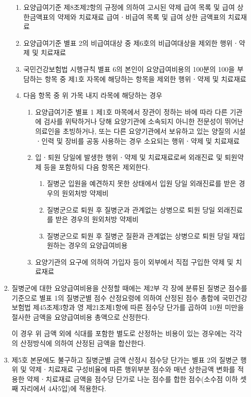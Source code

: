 \begin{enumerate}[1.]
\begin{enumerate}[가.]
	\item 요양급여기준 제8조제2항의 규정에 의하여 고시된 약제 급여 목록 및 급여 상한금액표의 약제와 치료재료 급여ㆍ비급여 목록 및 급여 상한 금액표의 치료재료
	\item 요양급여기준 별표 2의 비급여대상 중 제6호의 비급여대상을 제외한 행위ㆍ약제 및 치료재료
	\item 국민건강보험법 시행규칙 별표 6의 본인이 요양급여비용의 100분의 100을 부담하는 항목 중 제1호 자목에 해당하는 항목을 제외한 행위ㆍ약제 및 치료재료
	\item 다음 항목 중 위 가목 내지 라목에 해당하는 경우
		\begin{enumerate}[(1)]\tightlist
		\item 요양급여기준 별표 1 제1호 마목에서 장관이 정하는 바에 따라 다른 기관에 검사를 위탁하거나 당해 요양기관에 소속되지 아니한 전문성이 뛰어난 의료인을 초빙하거나, 또는 다른 요양기관에서 보유하고 있는 양질의 시설ㆍ인력 및 장비를 공동 사용하는 경우 소요되는 행위ㆍ약제 및 치료재료
		\item 입ㆍ퇴원 당일에 발생한 행위ㆍ약제 및 치료재료로써 외래진료 및 퇴원약제 등을 포함하되 다음 항목은 제외한다.
			\begin{enumerate}[(가)]\tightlist
			\item 질병군 입원을 예견하지 못한 상태에서 입원 당일 외래진료를 받은 경우의 원외처방 약제비
			\item 질병군으로 퇴원 후 질병군과 관계없는 상병으로 퇴원 당일 외래진료를 받은 경우의 원외처방 약제비
			\item 질병군으로 퇴원 후 질병군 질환과 관계없는 상병으로 퇴원 당일 재입원하는 경우의 요양급여비용
			\end{enumerate}
		\item 요양기관의 요구에 의하여 가입자 등이 외부에서 직접 구입한 약제 및 치료재료
		\end{enumerate}
	\end{enumerate}	
\item 질병군에 대한 요양급여비용을 산정할 때에는 제2부 각 장에 분류된 질병군 점수를 기준으로 별표 1의 질병군별 점수 산정요령에 의하여 산정된 점수 총합에 국민건강보험법 제45조제3항과 영 제21조제1항에 따른 점수당 단가를 곱하여 10원 미만을 절사한 금액을 요양급여비용 총액으로 산정한다.\par
이 경우 위 금액 외에 식대를 포함한 별도로 산정하는 비용이 있는 경우에는 각각의 산정방식에 의하여 산정된 금액을 합산한다.
\item 제5호 본문에도 불구하고 질병군별 금액 산정시 점수당 단가는 별표 2의 질병군 행위 및 약제ㆍ치료재료 구성비율에 따른 행위부분 점수와 매년 상한금액 변화를 적용한 약제ㆍ치료재료 금액을 점수당 단가로 나눈 점수를 합한 점수(소수점 이하 셋째 자리에서 4사5입)에 적용한다.\par

\end{enumerate}
